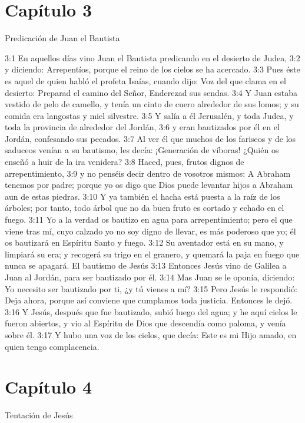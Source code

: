\section*{Capítulo 3}
Predicación de Juan el Bautista 

3:1 En aquellos días vino Juan el Bautista predicando en el desierto de Judea, 
3:2 y diciendo: Arrepentíos, porque el reino de los cielos se ha acercado. 
3:3 Pues éste es aquel de quien habló el profeta Isaías, cuando dijo: 
Voz del que clama en el desierto: 
Preparad el camino del Señor, 
Enderezad sus sendas. 
3:4 Y Juan estaba vestido de pelo de camello, y tenía un cinto de cuero alrededor de sus lomos; y su comida era langostas y miel silvestre. 
3:5 Y salía a él Jerusalén, y toda Judea, y toda la provincia de alrededor del Jordán, 
3:6 y eran bautizados por él en el Jordán, confesando sus pecados. 
3:7 Al ver él que muchos de los fariseos y de los saduceos venían a su bautismo, les decía: ¡Generación de víboras! ¿Quién os enseñó a huir de la ira venidera? 
3:8 Haced, pues, frutos dignos de arrepentimiento, 
3:9 y no penséis decir dentro de vosotros mismos: A Abraham tenemos por padre; porque yo os digo que Dios puede levantar hijos a Abraham aun de estas piedras. 
3:10 Y ya también el hacha está puesta a la raíz de los árboles; por tanto, todo árbol que no da buen fruto es cortado y echado en el fuego. 
3:11 Yo a la verdad os bautizo en agua para arrepentimiento; pero el que viene tras mí, cuyo calzado yo no soy digno de llevar, es más poderoso que yo; él os bautizará en Espíritu Santo y fuego. 
3:12 Su aventador está en su mano, y limpiará su era; y recogerá su trigo en el granero, y quemará la paja en fuego que nunca se apagará. 
El bautismo de Jesús 
3:13 Entonces Jesús vino de Galilea a Juan al Jordán, para ser bautizado por él. 
3:14 Mas Juan se le oponía, diciendo: Yo necesito ser bautizado por ti, ¿y tú vienes a mí? 
3:15 Pero Jesús le respondió: Deja ahora, porque así conviene que cumplamos toda justicia. Entonces le dejó. 
3:16 Y Jesús, después que fue bautizado, subió luego del agua; y he aquí cielos le fueron abiertos, y vio al Espíritu de Dios que descendía como paloma, y venía sobre él. 
3:17 Y hubo una voz de los cielos, que decía: Este es mi Hijo amado, en quien tengo complacencia. 
\section*{Capítulo 4}
Tentación de Jesús  

